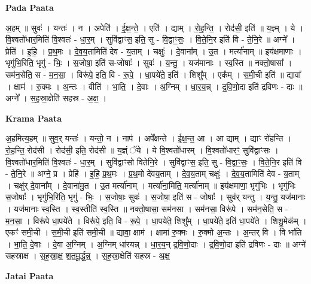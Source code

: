 \documentclass[17pt]{extarticle}
\begin{document}
\textbf{Pada Paata} \newline

अ॒हम् ॥ सुवः॑ । यन्तः॑ । न । अपेति॑ । ई॒क्ष॒न्ते॒ । एति॑ । द्याम् । रो॒ह॒न्ति॒ । रोद॑सी॒ इति॑ ॥ य॒ज्ञ्म् । ये । वि॒श्वतो॑धार॒मिति॑ वि॒श्वतः॑ - धा॒र॒म् । सुवि॑द्वाꣳस॒ इति॒ सु - वि॒द्वाꣳ॒॒सः॒ । वि॒ते॒नि॒र इति॑ वि - ते॒नि॒रे ॥ अग्ने᳚ । प्रेति॑ । इ॒हि॒ । प्र॒थ॒मः । दे॒व॒य॒तामिति॑ देव - य॒ताम् । चक्षुः॑ । दे॒वाना᳚म् । उ॒त । मर्त्या॑नाम् ॥ इय॑क्षमाणाः । भृगु॑भि॒रिति॒ भृगु॑ - भिः॒ । स॒जोषा॒ इति॑ स-जोषाः᳚ । सुवः॑ । य॒न्तु॒ । यज॑मानाः । स्व॒स्ति ॥ नक्तो॒षासा᳚ । सम॑न॒सेति॒ स - म॒न॒सा॒ । विरू॑पे॒ इति॒ वि - रू॒पे॒ । धा॒पये॑ते॒ इति॑ । शिशु᳚म् । एक᳚म् । स॒मी॒ची इति॑ ॥ द्यावा᳚ । क्षाम॑ । रु॒क्मः । अ॒न्तः । वीति॑ । भा॒ति॒ । दे॒वाः । अ॒ग्निम् । धा॒र॒य॒न्न् । द्र॒वि॒णो॒दा इति॑ द्रविणः - दाः ॥ अग्ने᳚ । स॒ह॒स्रा॒क्षेति॑ सहस्र - अ॒क्ष॒ ।  \newline


\textbf{Krama Paata} \newline

अ॒हमित्य॒हम् ॥ सुव॒र् यन्तः॑ । यन्तो॒ न । नाप॑ । अपे᳚क्षन्ते । ई॒क्ष॒न्त॒ आ । आ द्याम् । द्याꣳ रो॑हन्ति । रो॒ह॒न्ति॒ रोद॑सी । रोद॑सी॒ इति॒ रोद॑सी ॥ य॒ज्ञ्ं ॅये । ये वि॒श्वतो॑धारम् । वि॒श्वतो॑धारꣳ॒॒ सुवि॑द्वाꣳसः । वि॒श्वतो॑धार॒मिति॑ वि॒श्वतः॑ - धा॒र॒म् । सुवि॑द्वाꣳसो वितेनि॒रे । सुवि॑द्वाꣳस॒ इति॒ सु - वि॒द्वाꣳ॒॒सः॒ । वि॒ते॒नि॒र इति॑ वि - ते॒नि॒रे ॥ अग्ने॒ प्र । प्रेहि॑ । इ॒हि॒ प्र॒थ॒मः । प्र॒थ॒मो दे॑वय॒ताम् । दे॒व॒य॒ताम् चक्षुः॑ । दे॒व॒य॒तामिति॑ देव - य॒ताम् । चक्षु॑र् दे॒वाना᳚म् । दे॒वाना॑मु॒त । उ॒त मर्त्या॑नाम् । मर्त्या॑ना॒मिति॒ मर्त्या॑नाम् ॥ इय॑क्षमाणा॒ भृगु॑भिः । भृगु॑भिः स॒जोषाः᳚ । भृगु॑भि॒रिति॒ भृगु॑ - भिः॒ । स॒जोषाः॒ सुवः॑ । स॒जोषा॒ इति॑ स - जोषाः᳚ । सुव॑र् यन्तु । य॒न्तु॒ यज॑मानाः । यज॑मानाः स्व॒स्ति । स्व॒स्तीति॑ स्व॒स्ति ॥ नक्तो॒षासा॒ सम॑नसा । सम॑नसा॒ विरू॑पे । सम॑न॒सेति॒ स - म॒न॒सा॒ । विरू॑पे धा॒पये॑ते । विरू॑पे॒ इति॒ वि - रू॒पे॒ । धा॒पये॑ते॒ शिशु᳚म् । धा॒पये॑ते॒ इति॑ धा॒पये॑ते । शिशु॒मेक᳚म् । एकꣳ॑ समी॒ची । स॒मी॒ची इति॑ समी॒ची ॥ द्यावा॒ क्षाम॑ । क्षामा॑ रु॒क्मः । रु॒क्मो अ॒न्तः । अ॒न्तर् वि । वि भा॑ति । भा॒ति॒ दे॒वाः । दे॒वा अ॒ग्निम् । अ॒ग्निम् धा॑रयन्न् । धा॒र॒य॒न् द्र॒वि॒णो॒दाः । द्र॒वि॒णो॒दा इति॑ द्रविणः - दाः ॥ अग्ने॑ सहस्राक्ष । स॒ह॒स्रा॒क्ष॒ श॒त॒मू॒र्द्ध॒न्न्॒ । स॒ह॒स्रा॒क्षेति॑ सहस्र - अ॒क्ष॒ \newline

\textbf{Jatai Paata} \newline
\end{document}
